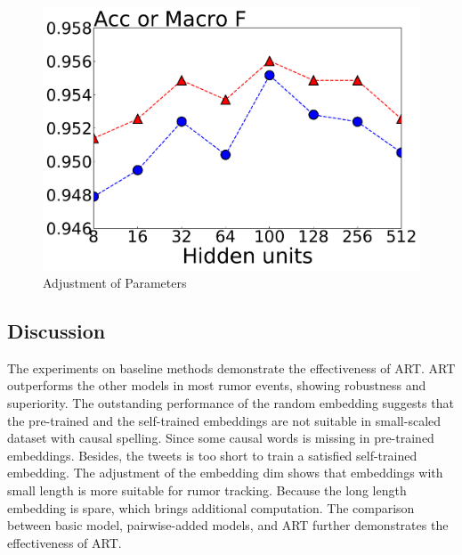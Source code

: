 \begin{figure}[htbp]
{\begin{minipage}[b]{0.35\linewidth}
			\includegraphics[width=1\linewidth]{fig/hidden_units}
		\end{minipage}
	}
	\caption{Adjustment of Parameters}
	\label{fig:parameter}
\end{figure}


\subsection{Discussion}
The experiments on baseline methods demonstrate the effectiveness of ART. ART outperforms the other models in most rumor events, showing robustness and superiority. The outstanding performance of the random embedding suggests that the pre-trained and the self-trained embeddings are not suitable in small-scaled dataset with causal spelling. Since some causal words is missing in pre-trained embeddings. Besides, the tweets is too short to train a satisfied self-trained embedding. The adjustment of the embedding dim shows that embeddings with small length is more suitable for rumor tracking. Because the long length embedding is spare, which brings additional computation. The comparison between basic model, pairwise-added models, and ART further demonstrates the effectiveness of ART. 

